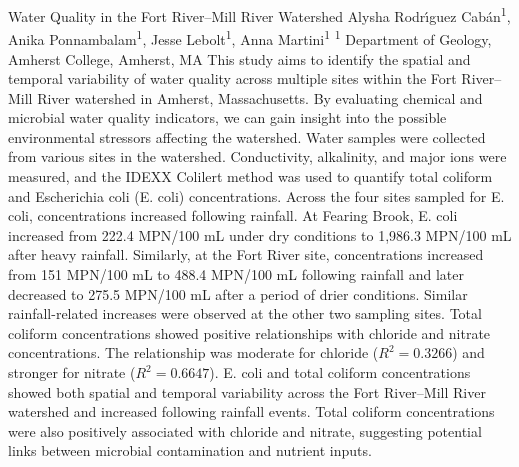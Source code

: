\makeabstract
    {
    Water Quality in the Fort River--Mill River Watershed
    }
    {
    Alysha Rodr{\'\i}guez Cab\'an\textsuperscript{1}, Anika Ponnambalam\textsuperscript{1}, Jesse Lebolt\textsuperscript{1}, Anna Martini\textsuperscript{1}
    }
    {
    \textsuperscript{1} Department of Geology, Amherst College, Amherst, MA
    }
    {
    This study aims to identify the spatial and temporal variability of water quality across multiple sites within the Fort River--Mill River watershed in Amherst, Massachusetts. By evaluating chemical and microbial water quality indicators, we can gain insight into the possible environmental stressors affecting the watershed.
    }
    {
    Water samples were collected from various sites in the watershed. Conductivity, alkalinity, and major ions were measured, and the IDEXX Colilert method was used to quantify total coliform and Escherichia coli (E. coli) concentrations.
    }
    {
    Across the four sites sampled for E. coli, concentrations increased following rainfall. At Fearing Brook, E. coli increased from 222.4 MPN/100 mL under dry conditions to 1,986.3 MPN/100 mL after heavy rainfall. Similarly, at the Fort River site, concentrations increased from 151 MPN/100 mL to 488.4 MPN/100 mL following rainfall and later decreased to 275.5 MPN/100 mL after a period of drier conditions. Similar rainfall-related increases were observed at the other two sampling sites. Total coliform concentrations showed positive relationships with chloride and nitrate concentrations. The relationship was moderate for chloride ($R^2 = 0.3266$) and stronger for nitrate ($R^2 = 0.6647$).
    }
    {
    E. coli and total coliform concentrations showed both spatial and temporal variability across the Fort River--Mill River watershed and increased following rainfall events. Total coliform concentrations were also positively associated with chloride and nitrate, suggesting potential links between microbial contamination and nutrient inputs.
    }

    \newpage
    
